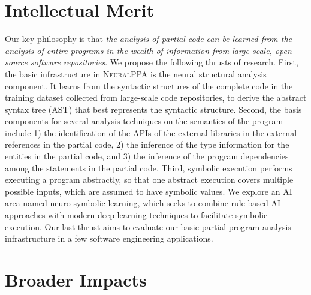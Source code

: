 \documentclass[11pt]{article}
\newcommand{\tool}{\textsc{NeuralPPA}\xspace}
\begin{document}
\section{Intellectual Merit}

Our key philosophy is that {\em the analysis of partial code can be
  learned from the analysis of entire programs in the wealth of
  information from large-scale, open-source software
  repositories}. We propose the following thrusts of
research. First, the basic infrastructure in {\tool} is the neural
structural analysis component. It learns from the syntactic structures
of the complete code in the training dataset collected from
large-scale code repositories, to derive the abstract syntax tree
(AST) that best represents the syntactic structure.
Second, the basis components for several analysis techniques on the
semantics of the program include 1) the identification of the APIs of
the external libraries in the external references in the partial code,
2) the inference of the type information for the entities in the
partial code, and 3) the inference of the program dependencies among
the statements in the partial code. Third, symbolic execution performs
executing a program abstractly, so that one abstract execution covers
multiple possible inputs, which are assumed to have symbolic
values. We explore an AI area named neuro-symbolic
learning, which seeks to combine rule-based AI approaches
with modern deep learning techniques to facilitate symbolic execution.
Our last thrust aims to evaluate our basic partial
program analysis infrastructure in a few software engineering applications.


\section{Broader Impacts}
\end{document}
